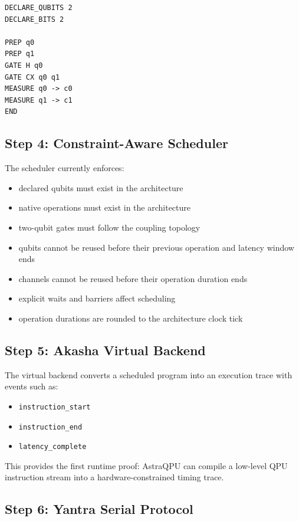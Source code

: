 \documentclass[11pt,a4paper]{article}
\begin{document}
\begin{lstlisting}[style=astra]
DECLARE_QUBITS 2
DECLARE_BITS 2

PREP q0
PREP q1
GATE H q0
GATE CX q0 q1
MEASURE q0 -> c0
MEASURE q1 -> c1
END
\end{lstlisting}

\subsection{Step 4: Constraint-Aware Scheduler}

The scheduler currently enforces:

\begin{itemize}[leftmargin=*]
  \item declared qubits must exist in the architecture
  \item native operations must exist in the architecture
  \item two-qubit gates must follow the coupling topology
  \item qubits cannot be reused before their previous operation and latency window ends
  \item channels cannot be reused before their operation duration ends
  \item explicit waits and barriers affect scheduling
  \item operation durations are rounded to the architecture clock tick
\end{itemize}

\subsection{Step 5: Akasha Virtual Backend}

The virtual backend converts a scheduled program into an execution trace with events such as:

\begin{itemize}[leftmargin=*]
  \item \texttt{instruction\_start}
  \item \texttt{instruction\_end}
  \item \texttt{latency\_complete}
\end{itemize}

This provides the first runtime proof: AstraQPU can compile a low-level QPU instruction stream into a hardware-constrained timing trace.

\subsection{Step 6: Yantra Serial Protocol}
\end{document}
